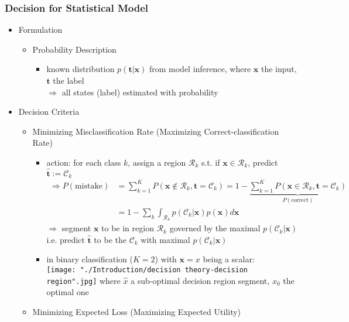\subsubsection{Decision for Statistical Model}
\begin{itemize}
\item Formulation
	\begin{itemize}
	\item Probability Description
		\begin{itemize}
		\item known distribution $p(\mathbf t|\mathbf x)$ from model inference, where $\mathbf x$ the input, $\mathbf t$ the label \\
		$\Rightarrow$ all states (label) estimated with probability
		\end{itemize}		
	\end{itemize}
\item Decision Criteria
	\begin{itemize}
	\item Minimizing Misclassification Rate (Maximizing Correct-classification Rate)
		\begin{itemize}
		\item action: for each class $k$, assign a region $\mathcal R_k$ s.t. if $\mathbf x\in \mathcal R_k$, predict $\hat {\mathbf t} := \mathcal C_k$
		\begin{align*}\Rightarrow \displaystyle P(\text{mistake}) &= \sum_{k=1}^K P(\mathbf x\not\in \mathcal R_k, \mathbf t=\mathcal C_k) = 1-\underbrace{\sum_{k=1}^K P(\mathbf x\in\mathcal R_k, \mathbf t=\mathcal C_k)}_{P(\text{correct})} \\ &= 1-\sum_k\int_{\mathcal R_k}p(\mathcal C_k|\mathbf x) p(\mathbf x) d\mathbf x \end{align*}
		$\Rightarrow$ segment $\mathbf x$ to be in region $\mathcal R_k$ governed by the maximal $p(\mathcal C_k | \mathbf x)$ \\
		i.e. predict $\hat {\mathbf t}$ to be the $\mathcal C_k$ with maximal $p(\mathcal C_k | \mathbf x)$
		\item in binary classification ($K=2$) with $\mathbf x = x$ being a scalar: \\
		\texttt{[image: "./Introduction/decision theory-decision region".jpg]}
		where $\hat x$ a sub-optimal decision region segment, $x_0$ the optimal one
		\end{itemize}
	\item Minimizing Expected Loss (Maximizing Expected Utility)
		\begin{itemize}

\end{itemize}
\end{itemize}
\end{itemize}
